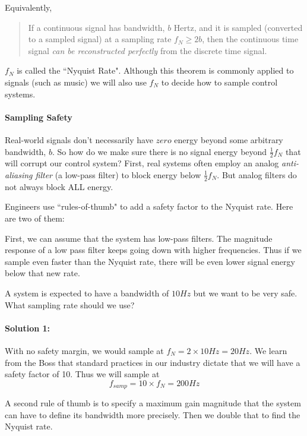 Equivalently,

\begin{quotation}
  If a continuous signal has bandwidth, $b$ Hertz, and it is sampled (converted to a sampled signal) at a sampling rate
$f_N \geq  2b$, then the continuous time signal {\it can be reconstructed perfectly} from the discrete time signal.
\end{quotation}

$f_N$ is called the ``Nyquist Rate".   Although this theorem is commonly applied to signals (such as music) 
we will also use $f_N$ to decide how to sample control systems.

\paragraph{Sampling Safety}
Real-world signals don't necessarily have $zero$ energy beyond some arbitrary bandwidth, $b$.   So how do we make sure there is no signal 
energy beyond $\frac{1}{2}f_N$  that will corrupt our control system?    First, real systems often employ an analog {\it anti-aliasing filter} 
(a low-pass filter) to block energy below $\frac{1}{2}f_N$.  But analog filters do not always block ALL energy.   

Engineers use ``rules-of-thumb" to add a safety factor to the Nyquist rate.   Here are two of them:

First, we can assume that the system has low-pass filters.  The magnitude response of a low pass filter keeps going down with higher frequencies.
Thus if we sample even faster than the Nyquist rate, there will be even lower signal energy below that new rate.

\begin{ExampleSmall}
A system is expected to have a bandwidth of $10Hz$ but we want to be very safe.   What sampling rate should we use?

\paragraph{Solution 1:}   With no safety margin, we would sample at $f_N  = 2\times10Hz = 20Hz$.   We learn from the Boss that standard practices 
in our industry dictate that we will have a safety factor of 10.   Thus we will sample at 
\[
f_{samp} = 10\times f_N = 200Hz
\]
\end{ExampleSmall}

A second rule of thumb is to specify a maximum gain magnitude that the system can have to define its bandwidth more precisely.  Then we double that to find the 
Nyquist rate. 

